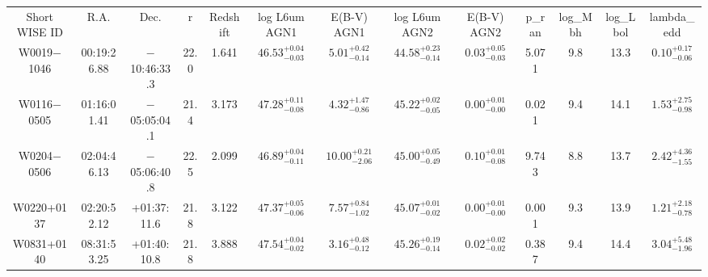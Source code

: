 \begin{table}
\begin{tabular}{ccccccccccccc}
Short WISE ID & R.A. & Dec. & r & Redshift & log L6um AGN1 & E(B-V) AGN1 & log L6um AGN2 & E(B-V) AGN2 & p_ran & log_Mbh & log_Lbol & lambda_edd \\
W0019$-$1046 & 00:19:26.88 & $-$10:46:33.3 & 22.0 & 1.641 & $46.53^{+0.04}_{-0.03}$ & $ 5.01^{+0.42}_{-0.14}$ & $44.58^{+0.23}_{-0.14}$ & $ 0.03^{+0.05}_{-0.03}$ & 5.071 & 9.8 & 13.3 & $ 0.10^{+0.17}_{-0.06}$ \\
W0116$-$0505 & 01:16:01.41 & $-$05:05:04.1 & 21.4 & 3.173 & $47.28^{+0.11}_{-0.08}$ & $ 4.32^{+1.47}_{-0.86}$ & $45.22^{+0.02}_{-0.05}$ & $ 0.00^{+0.01}_{-0.00}$ & 0.021 & 9.4 & 14.1 & $ 1.53^{+2.75}_{-0.98}$ \\
W0204$-$0506 & 02:04:46.13 & $-$05:06:40.8 & 22.5 & 2.099 & $46.89^{+0.04}_{-0.11}$ & $10.00^{+0.21}_{-2.06}$ & $45.00^{+0.05}_{-0.49}$ & $ 0.10^{+0.01}_{-0.08}$ & 9.743 & 8.8 & 13.7 & $ 2.42^{+4.36}_{-1.55}$ \\
W0220+0137 & 02:20:52.12 & +01:37:11.6 & 21.8 & 3.122 & $47.37^{+0.05}_{-0.06}$ & $ 7.57^{+0.84}_{-1.02}$ & $45.07^{+0.01}_{-0.02}$ & $ 0.00^{+0.01}_{-0.00}$ & 0.001 & 9.3 & 13.9 & $ 1.21^{+2.18}_{-0.78}$ \\
W0831+0140 & 08:31:53.25 & +01:40:10.8 & 21.8 & 3.888 & $47.54^{+0.04}_{-0.02}$ & $ 3.16^{+0.48}_{-0.12}$ & $45.26^{+0.19}_{-0.14}$ & $ 0.02^{+0.02}_{-0.02}$ & 0.387 & 9.4 & 14.4 & $ 3.04^{+5.48}_{-1.96}$ \\
\end{tabular}
\end{table}
